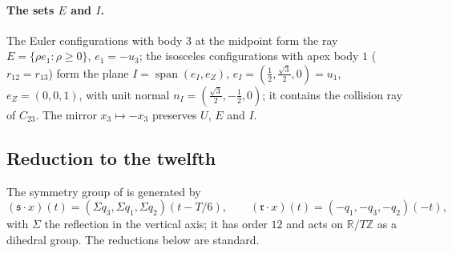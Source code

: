 \documentclass[11pt]{article}
\theoremstyle{definition}
\begin{document}
\paragraph{The sets $E$ and $I$.} The Euler configurations with body $3$ at the midpoint form the ray
$E=\{\rho e_1:\rho\ge0\}$, $e_1=-u_3$; the isosceles
configurations with apex body $1$ ($r_{12}=r_{13}$) form the plane $I=\operatorname{span}(e_I,e_Z)$,
$e_I=(\tfrac12,\tfrac{\sqrt3}2,0)=u_1$, $e_Z=(0,0,1)$, with unit normal $n_I=(\tfrac{\sqrt3}2,-\tfrac12,0)$; it contains
the collision ray of $C_{23}$. The mirror $x_3\mapsto-x_3$ preserves $U$, $E$ and $I$.

\subsection{Reduction to the twelfth}\label{sec:reduction}
The symmetry group of \cite{CM} is generated by
\[
(\mathfrak s\cdot x)(t)=(\Sigma q_3,\Sigma q_1,\Sigma q_2)(t-T/6),\qquad (\mathfrak r\cdot x)(t)=(-q_1,-q_3,-q_2)(-t),
\]
with $\Sigma$ the reflection in the vertical axis; it has order $12$ and acts on $\mathbb R/T\mathbb Z$ as a dihedral
group. The reductions below are standard.
\end{document}
